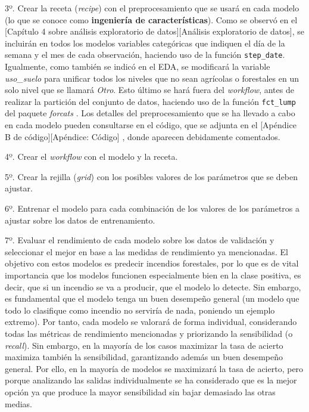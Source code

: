\documentclass[12pt,a4paper,]{book}
\numberwithin{dummy}{section}
\theoremstyle{ocrenumbox}
\theoremstyle{blacknumex}
\theoremstyle{blacknumbox}
\theoremstyle{ocrenum}
\theoremstyle{ocrenum}
\begin{document}
3º. Crear la receta (\emph{recipe}) con el preprocesamiento que se usará
en cada modelo (lo que se conoce como \textbf{ingeniería de
características}). Como se observó en el {[}Capítulo 4 sobre análisis
exploratorio de datos{]}{[}Análisis exploratorio de datos{]}, se
incluirán en todos los modelos variables categóricas que indiquen el día
de la semana y el mes de cada observación, haciendo uso de la función
\texttt{step\_date}. Igualmente, como también se indicó en el EDA, se
modificará la variable \emph{uso\_suelo} para unificar todos los niveles
que no sean agrícolas o forestales en un solo nivel que se llamará
\emph{Otro}. Esto último se hará fuera del \emph{workflow}, antes de
realizar la partición del conjunto de datos, haciendo uso de la función
\texttt{fct\_lump} del paquete \emph{forcats} \citep{forcatspackage}.
Los detalles del preprocesamiento que se ha llevado a cabo en cada
modelo pueden consultarse en el código, que se adjunta en el {[}Apéndice
B de código{]}{[}Apéndice: Código{]} , donde aparecen debidamente
comentados.

4º. Crear el \emph{workflow} con el modelo y la receta.

5º. Crear la rejilla (\emph{grid}) con los posibles valores de los
parámetros que se deben ajustar.

6º. Entrenar el modelo para cada combinación de los valores de los
parámetros a ajustar sobre los datos de entrenamiento.

7º. Evaluar el rendimiento de cada modelo sobre los datos de validación
y seleccionar el mejor en base a las medidas de rendimiento ya
mencionadas. El objetivo con estos modelos es predecir incendios
forestales, por lo que es de vital importancia que los modelos funcionen
especialmente bien en la clase positiva, es decir, que si un incendio se
va a producir, que el modelo lo detecte. Sin embargo, es fundamental que
el modelo tenga un buen desempeño general (un modelo que todo lo
clasifique como incendio no serviría de nada, poniendo un ejemplo
extremo). Por tanto, cada modelo se valorará de forma individual,
considerando todas las métricas de rendimiento mencionadas y priorizando
la sensibilidad (o \emph{recall}). Sin embargo, en la mayoría de los
casos maximizar la tasa de acierto maximiza también la sensibilidad,
garantizando además un buen desempeño general. Por ello, en la mayoría
de modelos se maximizará la tasa de acierto, pero porque analizando las
salidas individualmente se ha considerado que es la mejor opción ya que
produce la mayor sensibilidad sin bajar demasiado las otras medias.
\end{document}
